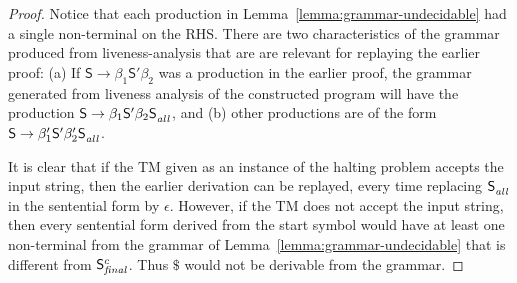 \documentclass[9pt,preprint,letter,nonatbib]{sigplanconf}
\begin{document}
\begin{proof}
Notice that  each production  in Lemma~\ref{lemma:grammar-undecidable}
had a single non-terminal on the RHS. There are two characteristics of
the grammar produced from liveness-analysis  that are are relevant for
replaying the  earlier proof:  (a) If $\mathsf{S}  \rightarrow \beta_1
\mathsf{S'}  \beta_2$  was a  production  in  the earlier  proof,  the
grammar  generated from  liveness  analysis of the constructed program
will  have the  production
$\mathsf{S}      \rightarrow      \beta_1     \mathsf{S'}      \beta_2
\mathsf{S}_{\mathit{\mathit{all}}}^{}$,  and (b)  other  productions are  of the  form
$\mathsf{S}       \rightarrow       \beta_1'\mathsf{S'}       \beta_2'
\mathsf{S}_{\mathit{all}}^{}$.

It is clear that if the TM given as an instance of the halting problem
accepts the input string, then the earlier derivation can be replayed,
every   time   replacing   $\mathsf{S}_{\mathit{\mathit{all}}}^{}$   in   the
sentential form by $\epsilon$. However, if  the TM does not accept the
input string, then every sentential form derived from the start symbol
would    have     at    least    one    non-terminal from the grammar
of Lemma~\ref{lemma:grammar-undecidable} that is different
from $\mathsf{S}_{\mathit{final}}^{c}$.   Thus  $\$$  would  not  be
derivable from the grammar.
\end{proof}
\end{document}
